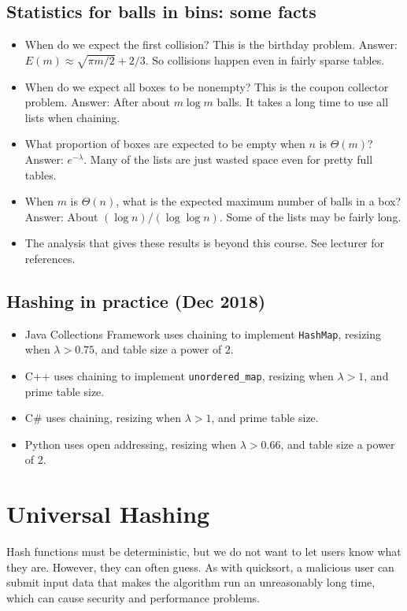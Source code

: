 \section{Statistics for balls in bins: some facts}
\begin{itemize}
\item When do we expect the first collision? This is the birthday problem. 
Answer: $E(m) \approx \sqrt{\pi m/2} + 2/3$.
So collisions happen even in fairly sparse tables.
\item When do we expect all boxes to be nonempty? 
This is the coupon collector problem. Answer: After about $m \log m$ balls. 
It takes a long time to use all lists when chaining.
\item What proportion of boxes are expected to be empty when $n$ is $\Theta(m)$? 
Answer: $e^{-\lambda}$. Many of the lists are just wasted space even for 
pretty full tables.
\item When $m$ is $\Theta(n)$, what is the expected maximum number of balls in a box? 
Answer: About $(\log n)/(\log \log n)$. Some of the lists may be fairly long. 
\item The analysis that gives these results is beyond this course. 
See lecturer for references.
\end{itemize}

\section{Hashing in practice (Dec 2018)}
\begin{itemize}
\item Java Collections Framework uses chaining to implement \texttt{HashMap}, resizing when $\lambda > 0.75$, and table size a power of $2$.
\item C++  uses chaining to implement \texttt{unordered\_map}, resizing when $\lambda >1$, and prime table size.
\item C\# uses chaining, resizing when $\lambda > 1$, and prime table size.
\item Python uses open addressing, resizing when $\lambda > 0.66$, and table size a power of $2$.
\end{itemize}



\chapter{Universal Hashing} %
Hash functions must be deterministic, but we do not want to let users know what they are. 
However, they can often guess. As with quicksort, a malicious user can submit input data that makes the 
algorithm run an unreasonably long time, which can cause security and performance problems.


